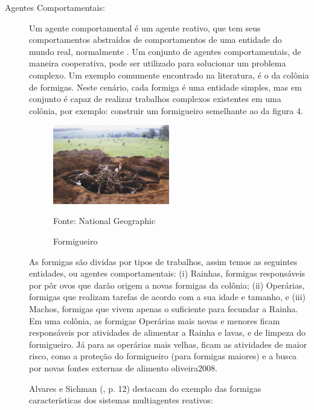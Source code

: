 \begin{description}
\item[Agentes Comportamentais:]

Um agente comportamental é um agente reativo, que tem seus comportamentos abstraídos de comportamentos de uma entidade do mundo real, normalmente \cite[p. 33]{oliveira2008}. Um conjunto de agentes comportamentais, de maneira cooperativa, pode ser utilizado para solucionar um problema complexo. Um exemplo comumente encontrado na literatura, é o da colônia de formigas. Neste cenário, cada formiga é uma entidade simples, mas em conjunto é capaz de realizar trabalhos complexos existentes em uma colônia, por exemplo: construir um formigueiro semelhante ao da figura 4.

\begin{figure}[h!]
\centering
\label{f02}
\includegraphics[width=0.5\textwidth]{figuras/f02}
\caption{Formigueiro} {Fonte: National Geographic}

\end{figure}

As formigas são dividas por tipos de trabalhos, assim temos as seguintes entidades, ou agentes comportamentais: (i) Rainhas, formigas responsáveis por pôr ovos que darão origem a novas formigas da colônia; (ii) Operárias, formigas que realizam tarefas de acordo com a sua idade e tamanho, e (iii) Machos, formigas que vivem apenas o suficiente para fecundar a Rainha. Em uma colônia, as formigas Operárias mais novas e menores ficam responsáveis por atividades de alimentar a Rainha e lavas, e de limpeza do formigueiro. Já para as operárias mais velhas, ficam as atividades de maior risco, como a proteção do formigueiro (para formigas maiores) e a busca por novas fontes externas de alimento  {oliveira2008}.

Alvares e Sichman (\citeyear{alvares1997}, p. 12) destacam do exemplo das formigas características dos sistemas multiagentes reativos:

\begin{citacao}
\begin{enumerate}


\end{enumerate}
\end{citacao}
\end{description}
